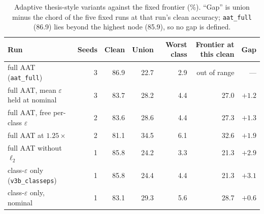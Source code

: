\documentclass[11pt]{article}
\begin{document}
\begin{table}[h]\centering\small
\caption{Adaptive thesis-style variants against the fixed frontier (\%). ``Gap'' is union minus the chord of the five fixed runs at that run's clean accuracy; \texttt{aat\_full} (86.9) lies beyond the highest node (85.9), so no gap is defined.}\label{tab:aat}
\begin{tabular}{lrrrrrr}\toprule
Run & Seeds & Clean & Union & Worst class & Frontier at this clean & Gap\\\midrule
full AAT (\texttt{aat\_full}) & 3 & 86.9 & 22.7 & 2.9 & out of range & ---\\
full AAT, mean $\varepsilon$ held at nominal & 3 & 83.7 & 28.2 & 4.4 & 27.0 & $+1.2$\\
full AAT, free per-class $\varepsilon$ & 2 & 83.6 & 28.6 & 4.4 & 27.3 & $+1.3$\\
full AAT at $1.25\times$ & 2 & 81.1 & 34.5 & 6.1 & 32.6 & $+1.9$\\
full AAT without $\ell_2$ & 1 & 85.8 & 24.2 & 3.3 & 21.3 & $+2.9$\\
class-$\varepsilon$ only (\texttt{v3b\_classeps}) & 1 & 85.8 & 24.4 & 4.4 & 21.3 & $+3.1$\\
class-$\varepsilon$ only, nominal & 1 & 83.1 & 29.3 & 5.6 & 28.7 & $+0.6$\\\bottomrule
\end{tabular}
\end{table}
\end{document}
